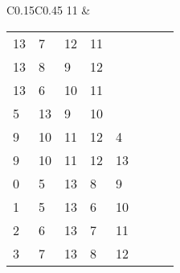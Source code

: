 \begin{longtable}{C{0.15\textwidth}C{0.45\textwidth}}
11 & 
\begin{tabular}{p{}p{}p{}p{}p{}p{}p{}p{}}
13 & 7 & 12 & 11 &  &  &  & \\
13 & 8 & 9 & 12 &  &  &  & \\
13 & 6 & 10 & 11 &  &  &  & \\
5 & 13 & 9 & 10 &  &  &  & \\
9 & 10 & 11 & 12 & 4 &  &  & \\
9 & 10 & 11 & 12 & 13 &  &  & \\
0 & 5 & 13 & 8 & 9 &  &  & \\
1 & 5 & 13 & 6 & 10 &  &  & \\
2 & 6 & 13 & 7 & 11 &  &  & \\
3 & 7 & 13 & 8 & 12 &  &  & \\
\end{tabular}
  \end{longtable}
\endgroup